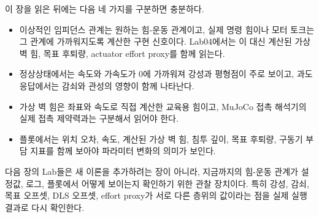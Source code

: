 이 장을 읽은 뒤에는 다음 네 가지를 구분하면 충분하다.
\begin{itemize}
  \item 이상적인 임피던스 관계는 원하는 힘-운동 관계이고, 실제 명령 힘이나 모터 토크는 그 관계에 가까워지도록 계산한 구현 신호이다. Lab04에서는 이 대신 계산된 가상 벽 힘, 목표 후퇴량, actuator effort proxy를 함께 읽는다.
  \item 정상상태에서는 속도와 가속도가 0에 가까워져 강성과 평형점이 주로 보이고, 과도응답에서는 감쇠와 관성의 영향이 함께 나타난다.
  \item 가상 벽 힘은 좌표와 속도로 직접 계산한 교육용 힘이고, MuJoCo 접촉 해석기의 실제 접촉 제약력과는 구분해서 읽어야 한다.
  \item 플롯에서는 위치 오차, 속도, 계산된 가상 벽 힘, 침투 깊이, 목표 후퇴량, 구동기 부담 지표를 함께 보아야 파라미터 변화의 의미가 보인다.
\end{itemize}

다음 장의 Lab들은 새 이론을 추가하려는 장이 아니라, 지금까지의 힘-운동 관계가 설정값, 로그, 플롯에서 어떻게 보이는지 확인하기 위한 관찰 장치이다.
특히 강성, 감쇠, 목표 오프셋, DLS 오프셋, effort proxy가 서로 다른 층위의 값이라는 점을 실제 실행 결과로 다시 확인한다.
